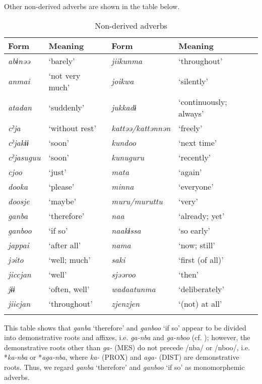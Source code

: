 Other non-derived adverbs are shown in the table below.

\begin{table}
\caption{\label{tab:27}Non-derived adverbs}
\begin{tabular}{llll}
\lsptoprule
Form & Meaning  &  Form & Meaning\\\midrule
\textit{abɨnəə} & ‘barely’  &  \textit{jiikunma} & ‘throughout’\\
\textit{anmai} & ‘not very much’  &  \textit{joikwa} & ‘silently’\\
\textit{atadan} & ‘suddenly’  &  \textit{jukkadɨ} & ‘continuously; always’\\
\textit{cˀja} & ‘without rest’  &  \textit{kattəə/kattənnən} & ‘freely’\\
\textit{cˀjakɨɨ} & ‘soon’  &  \textit{kundoo} & ‘next time’\\
\textit{cˀjasuguu} & ‘soon’  &  \textit{kunuguru} & ‘recently’\\
\textit{cjoo} & ‘just’  &  \textit{mata} & ‘again’\\
\textit{dooka} & ‘please’  &  \textit{minna} & ‘everyone’\\
\textit{doosje} & ‘maybe’  &  \textit{muru/muruttu} & ‘very’\\
\textit{ganba} & ‘therefore’  &  \textit{naa} & ‘already; yet’\\
\textit{ganboo} & ‘if so’  &  \textit{naakɨssa} & ‘so early’\\
\textit{jappai} & ‘after all’  &  \textit{nama} & ‘now; still’\\
\textit{jəito} & ‘well; much’  &  \textit{saki} & ‘first (of all)’\\
\textit{jiccjan} & ‘well’  &  \textit{sjəəroo} & ‘then’\\
\textit{jɨɨ} & ‘often, well’  &  \textit{wadaatunma} & ‘deliberately’\\
\textit{jiicjan} & ‘throughout’  &  \textit{zjenzjen} & ‘(not) at all’\\
\lspbottomrule
\end{tabular}
\end{table}

This table shows that \textit{ganba} ‘therefore’ and \textit{ganboo} ‘if so’ appear to be divided into demonstrative roots and affixes, i.e. \textit{ga-nba} and \textit{ga-nboo} (cf. ); however, the demonstrative roots other than \textit{ga-} (MES) do not precede /nba/ or /nboo/, i.e. *\textit{ka-nba} or *\textit{aga-nba}, where \textit{ka-} (PROX) and \textit{aga-} (DIST) are demonstrative roots. Thus, we regard \textit{ganba} ‘therefore’ and \textit{ganboo} ‘if so’ as monomorphemic adverbs.

